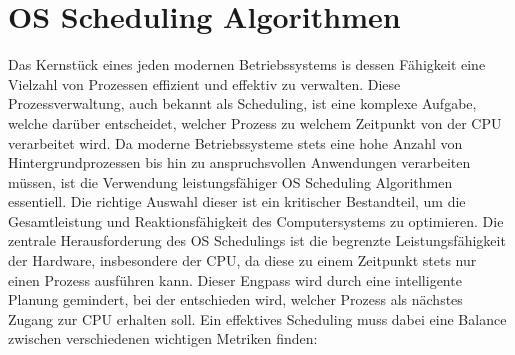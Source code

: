 \chapter{OS Scheduling Algorithmen}
Das Kernstück eines jeden modernen Betriebssystems is dessen Fähigkeit eine Vielzahl von Prozessen effizient und effektiv zu verwalten. Diese Prozessverwaltung, auch bekannt als Scheduling, ist eine komplexe Aufgabe, welche darüber entscheidet, welcher Prozess zu welchem Zeitpunkt von der \ac{CPU} verarbeitet wird. Da moderne Betriebssysteme stets eine hohe Anzahl von Hintergrundprozessen bis hin zu anspruchsvollen Anwendungen verarbeiten müssen, ist die Verwendung leistungsfähiger OS Scheduling Algorithmen essentiell. Die richtige Auswahl dieser ist ein kritischer Bestandteil, um die Gesamtleistung und Reaktionsfähigkeit des Computersystems zu optimieren. Die zentrale Herausforderung des OS Schedulings ist die begrenzte Leistungsfähigkeit der Hardware, insbesondere der CPU, da diese zu einem Zeitpunkt stets nur einen Prozess ausführen kann. Dieser Engpass wird durch eine intelligente Planung gemindert, bei der entschieden wird, welcher Prozess als nächstes Zugang zur CPU erhalten soll. Ein effektives Scheduling muss dabei eine Balance zwischen verschiedenen wichtigen Metriken finden:

